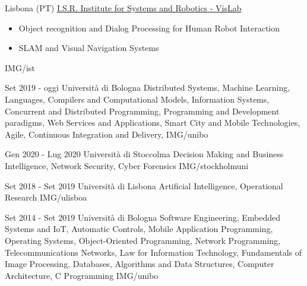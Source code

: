\documentclass[paper=a4,fontsize=11pt]{temp} %
\begin{document}
{Lisbona (PT) \href{https://welcome.isr.tecnico.ulisboa.pt/}{ I.S.R. Institute for Systems and Robotics - VisLab}}
{
 \begin{itemize}
    \item Object recognition and Dialog Processing for Human Robot Interaction
    \item SLAM and Visual Navigation Systems
 \end{itemize}
} {IMG/ist}

\noindent

{Set 2019 - oggi}
{Università di Bologna}
{Distributed Systems, Machine Learning,    Languages, Compilers and Computational Models,    Information Systems,     Concurrent and Distributed Programming,    Programming and Development paradigms,    Web Services and Applications,     Smart City and Mobile Technologies,     Agile, Continuous Integration and Delivery,  } 
 {IMG/unibo}

\sepspace

{Gen 2020 - Lug 2020}
{Università di Stoccolma}
{Decision Making and Business Intelligence, Network Security, Cyber Forensics}
{IMG/stockholmuni}

\sepspace

{Set 2018 - Set 2019}
{Università di Lisbona}
{Artificial Intelligence, Operational Research} 
{IMG/ulisboa}

\sepspace

{Set 2014 - Set 2019}
{Università di Bologna}
{Software Engineering, Embedded Systems and IoT, Automatic Controls, Mobile Application Programming, Operating Systems, Object-Oriented Programming, Network Programming, Telecommunications Networks, Law for Information Technology, Fundamentals of Image Processing, Databases, Algorithms and Data Structures, Computer Architecture, C Programming} 
{IMG/unibo}
\end{document}
